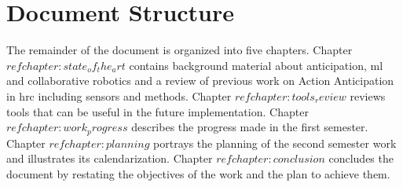 \section{Document Structure}

The remainder of the document is organized into five chapters. Chapter $ref{chapter:state_of_the_art}$ contains background material about anticipation, \acl{ml} and collaborative robotics and a review of previous work on Action Anticipation in \acs{hrc} including sensors and methods. Chapter $ref{chapter:tools_review}$ reviews tools that can be useful in the future implementation. Chapter $ref{chapter:work_progress}$ describes the progress made in the first semester. Chapter $ref{chapter:planning}$ portrays the planning of the second semester work and illustrates its calendarization. Chapter $ref{chapter:conclusion}$ concludes the document by restating the objectives of the work and the plan to achieve them.
